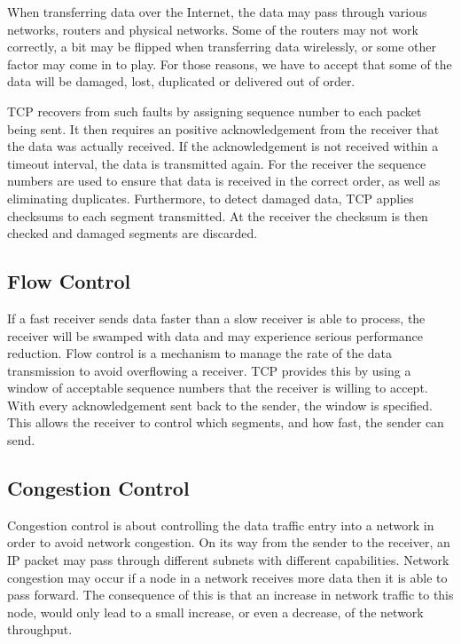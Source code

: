 When transferring data over the Internet, the data may pass through various
networks, routers and physical networks. Some of the routers may not work
correctly, a bit may be flipped when transferring data wirelessly, or some other
factor may come in to play. For those reasons, we have to accept that some of
the data will be damaged, lost, duplicated or delivered out of order.

TCP recovers from such faults by assigning sequence number to each packet being
sent. It then requires an positive acknowledgement from the receiver that the
data was actually received. If the acknowledgement is not received within a
timeout interval, the data is transmitted again. For the receiver the sequence
numbers are used to ensure that data is received in the correct order, as well
as eliminating duplicates. Furthermore, to detect damaged data, TCP applies
checksums to each segment transmitted. At the receiver the checksum is then
checked and damaged segments are discarded.

\subsection{Flow Control}

If a fast receiver sends data faster than a slow receiver is able to process,
the receiver will be swamped with data and may experience serious performance
reduction. Flow control is a mechanism to manage the rate of the data
transmission to avoid overflowing a receiver. TCP provides this by using a
window of acceptable sequence numbers that the receiver is willing to accept.
With every acknowledgement sent back to the sender, the window is specified.
This allows the receiver to control which segments, and how fast, the sender
can send.

\subsection{Congestion Control}

Congestion control is about controlling the data traffic entry into a network in
order to avoid network congestion. On its way from the sender to the receiver,
an IP packet may pass through different subnets with different capabilities.
Network congestion may occur if a node in a network receives more data then it
is able to pass forward. The consequence of this is that an increase in network
traffic to this node, would only lead to a small increase, or even a decrease,
of the network throughput\cite{Al-Bahadili2012}.

